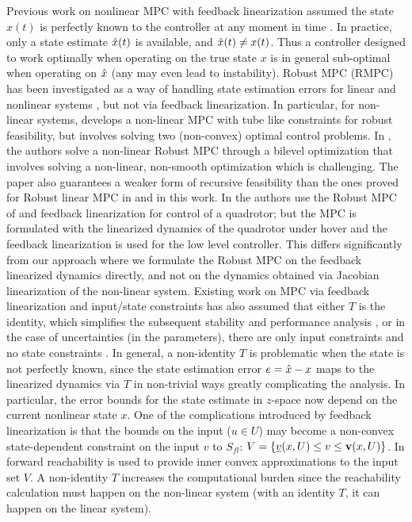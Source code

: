 Previous work on nonlinear MPC with feedback linearization assumed the state $x(t)$ is perfectly known to the controller at any moment in time \cite{SimonLG13_MPC}.
In practice, only a state estimate $\hat{x}(t)$ is available, and $\hat{x}(t) \neq x(t)$.
Thus a controller designed to work optimally when operating on the true state $x$ is in general sub-optimal when operating on $\hat{x}$ (any may even lead to instability).
Robust MPC (RMPC) has been investigated as a way of handling state estimation errors for linear \cite{RichardsH05_RMPC} and nonlinear systems \cite{tube,relaxed}, but not via feedback linearization. In particular, for non-linear systems, \cite{tube} develops a non-linear MPC with tube like constraints for robust feasibility, but involves solving two (non-convex) optimal control problems. In \cite{relaxed}, the authors solve a non-linear Robust MPC through a bilevel optimization that involves solving a non-linear, non-smooth optimization which is challenging. The paper also guarantees a weaker form of recursive feasibility than the ones proved for Robust linear MPC in \cite{RichardsH05_RMPC} and in this work. In \cite{Zhao20141335} the authors use the Robust MPC of \cite{RichardsH05_RMPC} and feedback linearization for control of a quadrotor; but the MPC is formulated with the linearized dynamics of the quadrotor under hover and the feedback linearization is used for the low level controller. This differs significantly from our approach where we formulate the Robust MPC on the feedback linearized dynamics directly, and not on the dynamics obtained via Jacobian linearization of the non-linear system.
Existing work on MPC via feedback linearization and input/state constraints has also assumed that either $T$ is the identity, which simplifies the subsequent stability and performance analysis \cite{SimonLG13_MPC}, or in the case of uncertainties (in the parameters), there are only input constraints and no state constraints \cite{parameter}.
In general, a non-identity $T$ is problematic when the state is not perfectly known, since the state estimation error $e = \hat{x}-x$ maps to the linearized dynamics via $T$ in non-trivial ways greatly complicating the analysis.
In particular, the error bounds for the state estimate in $z$-space now depend on the current nonlinear state $x$.
One of the complications introduced by feedback linearization is that the bounds on the input ($u \in U$) may become a non-convex state-dependent constraint on the input $v$ to $S_{fl}$: 
$V = \{\underline{v}(x, U) \leq v \leq \mathbf{v}(x,U)\}$.
In \cite{SimonLG13_MPC} forward reachability is used to provide inner convex approximations to the input set $V$.
A non-identity $T$ increases the computational burden since the reachability calculation must happen on the non-linear system (with an identity $T$, it can happen on the linear system).


